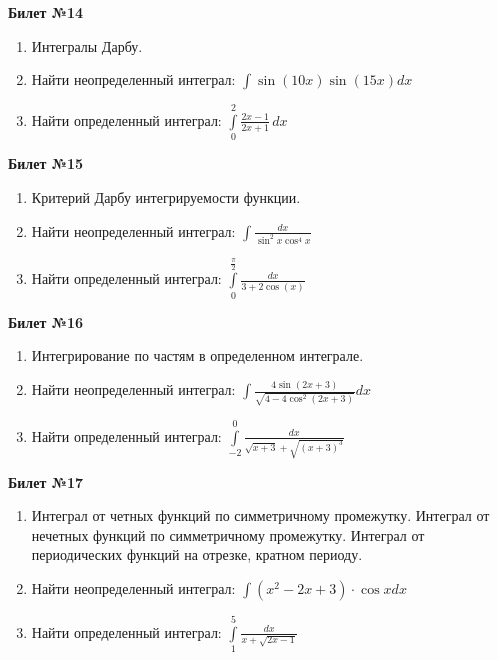 \documentclass[a4paper, 12pt]{article}
\begin{document}
\begin{center}
	\textbf{Билет №14}
\end{center}
\begin{enumerate}
	\item Интегралы Дарбу.
	\item Найти неопределенный интеграл: $\displaystyle \int{\sin(10x) \sin(15x) dx}$
	\item Найти определенный интеграл: $\displaystyle \int\limits_0^2 \frac{2x - 1}{2x + 1}\,dx$
\end{enumerate}

\begin{center}
	\textbf{Билет №15}
\end{center}
\begin{enumerate}
	\item Критерий Дарбу интегрируемости функции.
	\item Найти неопределенный интеграл: $\displaystyle \int{\frac{dx}{\sin^2 x \cos^4 x}}$
	\item Найти определенный интеграл: $\displaystyle \int\limits_{0}^{\frac{\pi}{2}} \frac{dx}{3 + 2 \cos(x)}$
\end{enumerate}

\begin{center}
	\textbf{Билет №16}
\end{center}
\begin{enumerate}
	\item Интегрирование по частям в определенном интеграле.
	\item Найти неопределенный интеграл: $\displaystyle \int{\frac{4 \sin(2x+3)}{\sqrt{4 - 4\cos^2(2x+3)}}dx}$
	\item Найти определенный интеграл: $\displaystyle \int\limits_{-2}^{0} \frac{dx}{\sqrt{x+3}+\sqrt{(x+3)^{3}}}$
\end{enumerate}

\begin{center}
	\textbf{Билет №17}
\end{center}
\begin{enumerate}
	\item Интеграл от четных функций по симметричному промежутку.
	Интеграл от нечетных функций по симметричному промежутку.
	Интеграл от периодических функций на отрезке, кратном периоду.
	\item Найти неопределенный интеграл: $\displaystyle \int{(x^2 - 2x + 3) \cdot \cos x dx}$
	\item Найти определенный интеграл: $\displaystyle \int\limits_{1}^{5} \frac{dx}{x + \sqrt{2x - 1}}$
\end{enumerate}
\end{document}
